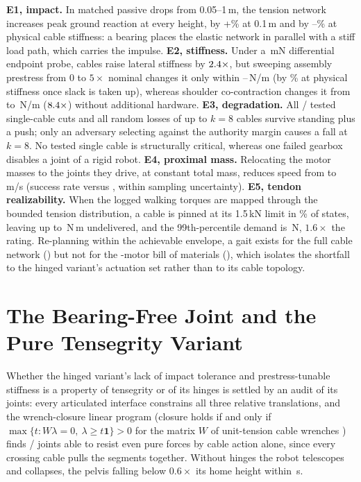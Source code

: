 \documentclass[letterpaper, 10pt, conference]{ieeeconf}
\begin{document}
\textbf{E1, impact.} In matched passive drops from 0.05--1\,m, the tension
network increases peak ground reaction at every height, by
+\eOneDeltaPassiveStumble\% at 0.1\,m and by
\physOneLimpTen--\physOneLimpHundred\% at physical cable stiffness: a
bearing places the elastic network in parallel with a stiff load path,
which carries the impulse. \textbf{E2, stiffness.} Under a \stiffProbe\,mN differential endpoint probe, cables raise
lateral stiffness by $2.4\times$, but sweeping assembly
prestress from $0$ to $5\times$ nominal changes it only within
\stiffPreLo--\stiffPreHi\,N/m (by \physTwoEngaged\% at physical stiffness
once slack is taken up), whereas shoulder co-contraction changes it from
\stiffCoLo{} to \stiffCoHi\,N/m ($8.4\times$) without additional
hardware.
\textbf{E3, degradation.} All \eThreeSinglesOk/\eThreeSinglesN{} tested single-cable cuts and all
random losses of up to $k=8$ cables survive standing plus a push; only an adversary selecting against the authority margin causes a fall
at $k=8$.
No tested single cable is structurally critical, whereas one failed
gearbox disables a joint of a rigid robot. \textbf{E4, proximal mass.} Relocating the motor masses to the
joints they drive, at constant total mass, reduces speed from \walkSpeed{}
to \distalSpeed\,m/s (success rate \walkRate{} versus \distalRate, within
sampling uncertainty). \textbf{E5, tendon realizability.} When the logged
walking torques are mapped through the bounded tension distribution, a
cable is pinned at its 1.5\,kN limit in \tensSatPct\% of states, leaving
up to \tensResid\,N\,m undelivered, and the 99th-percentile demand is
\tensNeeded\,N, $1.6\times$ the rating. Re-planning within the achievable envelope, a gait exists for the full
cable network (\eSixtendonallRate) but not for the \numMotors-motor bill
of materials (\eSixtendonbomRate), which isolates the shortfall to the
hinged variant's actuation set rather than to its cable topology.

\section{The Bearing-Free Joint and the Pure Tensegrity Variant}
\label{sec:jointcell}
Whether the hinged variant's lack of impact tolerance and
prestress-tunable stiffness is a property of tensegrity or of its hinges
is settled by an audit of its joints: every articulated interface
constrains all three relative translations, and the wrench-closure linear
program (closure holds if and only if
$\max\{t: W\lambda=0,\ \lambda\ge t\mathbf{1}\}>0$ for the matrix $W$ of
unit-tension cable wrenches \cite{bosscher2004wrench,gouttefarde2007wfw})
finds \wcThree/\wcTotal{} joints able to resist even pure forces by cable
action alone, since every crossing cable pulls the segments together.
Without hinges the robot telescopes and collapses, the pelvis falling
below $0.6\times$ its home height within \collapseT\,s.
\end{document}
